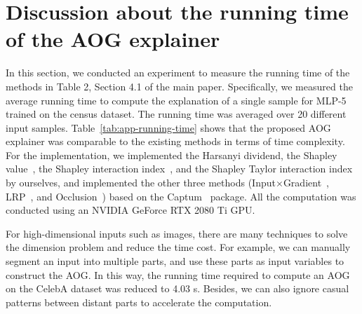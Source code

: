 \section{Discussion about the running time of the AOG explainer}

In this section, we conducted an experiment to measure the running time of the methods in Table 2, Section 4.1 of the main paper.
Specifically, we measured the average running time to compute the explanation of a single sample for MLP-5 trained on the census dataset. 
The running time was averaged over 20 different input samples. 
Table~\ref{tab:app-running-time} shows that the proposed AOG explainer was comparable to the existing methods in terms of time complexity.
For the implementation, we implemented the Harsanyi dividend, the Shapley value~\cite{shapley1953value}, the Shapley interaction index~\cite{grabisch1999axiomatic}, and the Shapley Taylor interaction index~\cite{sundararajan2020shapley} by ourselves, and implemented the other three methods (Input{\small$\times$}Gradient~\cite{shrikumar2016not}, LRP~\cite{bach2015pixel}, and Occlusion~\cite{zeiler2014visualizing}) based on the Captum~\cite{kokhlikyan2020captum} package.
All the computation was conducted using an NVIDIA GeForce RTX 2080 Ti GPU. 

\begin{table}[h]
\caption{The average running time to compute the explanation of a single sample, based on different methods.}
\label{tab:app-running-time}
\vspace{-8pt}
\centering
{}
\end{table}

For high-dimensional inputs such as images, there are many techniques to solve the dimension problem and reduce the time cost. For example, we can manually segment an input into multiple parts, and use these parts as input variables to construct the AOG. 
In this way, the running time required to compute an AOG on the CelebA dataset was reduced to 4.03 s.
Besides, we can also ignore casual patterns between distant parts to accelerate the computation.



